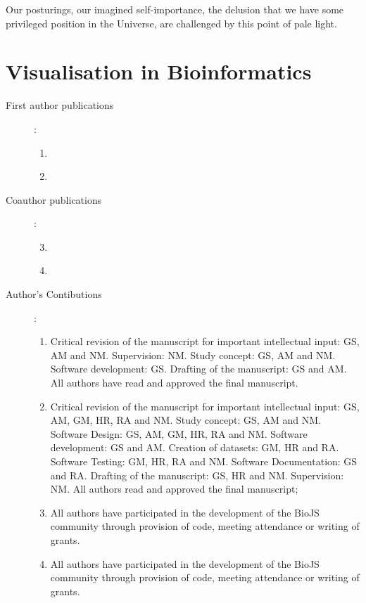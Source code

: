 \begin{savequote}[75mm] 
Our posturings, our imagined self-importance, the delusion that we have some privileged position in the Universe, are challenged by this point of pale light.
\end{savequote}

\chapter{Visualisation in Bioinformatics} \label{section:visualisation}




\begin{description}
	\item[First author publications]:\\
		\begin{enumerate}
			\item \label{paper:PPI} 
			\item  \label{paper:PINV} 
		\end{enumerate}

	\item[Coauthor publications]:\\
		\begin{enumerate}
			\setcounter{enumi}{2}
			\item \label{paper:biojs1} 
			\item \label{paper:biojs2} 
		\end{enumerate}
 
	\item[Author's Contibutions]:\\
		\begin{enumerate}
			\item Critical revision of the manuscript for important intellectual input: GS, AM and NM. Supervision: NM. Study concept: GS, AM and NM. Software development: GS. Drafting of the manuscript: GS and AM. All authors have read and approved the final manuscript.
			\item Critical revision of the manuscript for important intellectual input: GS, AM, GM, HR, RA and NM. Study concept: GS, AM and NM. Software Design: GS, AM, GM, HR, RA and NM. Software development: GS and AM. Creation of datasets: GM, HR and RA. Software Testing: GM, HR, RA and NM. Software Documentation: GS and RA. Drafting of the manuscript: GS, HR and NM. Supervision: NM. All authors read and approved the final manuscript;
			\item All authors have participated in the development of the BioJS community through provision of code, meeting attendance or writing of grants.
			\item All authors have participated in the development of the BioJS community through provision of code, meeting attendance or writing of grants.
		\end{enumerate}
\end{description}
